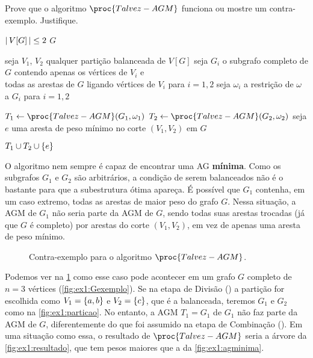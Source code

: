 Prove que o algoritmo $\proc{Talvez-AGM}$ funciona ou mostre um contra-exemplo.
Justifique.

\begin{codebox}

    \li \Se ${\left\lvert\,V[G]\,\right\rvert} \leq 2$ \Entao \Devolva $G$

    \li seja $V_1$, $V_2$ qualquer partição balanceada de $V[G]$
        \label{linha:ex1:divisao}
    \li seja $G_i$ o subgrafo completo de $G$ contendo apenas os vértices de $V_i$ e \\
    \qquad todas as arestas de $G$ ligando vértices de $V_i$ para $i=1,2$
    \li seja $\omega_i$ a restrição de $\omega$ a $G_i$ para $i=1,2$

    \li $T_1 \Recebe \proc{Talvez-AGM}(G_1, \omega_1)$
    \li $T_2 \Recebe \proc{Talvez-AGM}(G_2, \omega_2)$
    \li seja $e$ uma aresta de peso mínimo no corte $(V_1, V_2)$ em $G$

    \li \Devolva $T_1 \cup T_2 \cup \set{e}$
        \label{linha:ex1:combinacao}
\end{codebox}

\itemdsep
\newpage

O algoritmo nem sempre é capaz de encontrar uma AG \textbf{mínima}. Como os subgrafos $G_1$ e $G_2$ são arbitrários, a condição de serem balanceados não é o bastante para que a subestrutura ótima apareça. É possível que $G_1$ contenha, em um caso extremo, todas as arestas de maior peso do grafo $G$. Nessa situação, a AGM de $G_1$ não seria parte da AGM de $G$, sendo todas suas arestas trocadas (já que $G$ é completo) por arestas do corte $(V_1,V_2)$, em vez de apenas uma aresta de peso mínimo.

\begin{figure}[H]
    \centering
    

    \caption{Contra-exemplo para o algoritmo $\proc{Talvez-AGM}$.}
    \label{fig:ex1}
\end{figure}

Podemos ver na \cref{fig:ex1} como esse caso pode acontecer em um grafo $G$ completo de $n = 3$ vértices (\cref{fig:ex1:Gexemplo}). Se na etapa de Divisão () a partição for escolhida como $V_1 = \set{a, b}$ e $V_2 = \set{c}$, que é a balanceada, teremos $G_1$ e $G_2$ como na \cref{fig:ex1:particao}. No entanto, a AGM $T_1 = G_1$ de $G_1$ não faz parte da AGM de $G$, diferentemente do que foi assumido na etapa de Combinação (). Em uma situação como essa, o resultado de $\proc{Talvez-AGM}$ seria a árvore da \cref{fig:ex1:resultado}, que tem pesos maiores que a da \cref{fig:ex1:agminima}.
